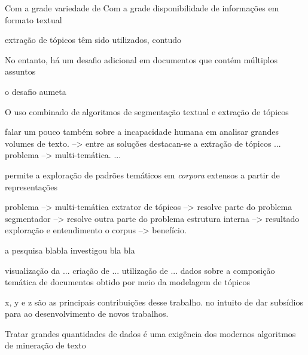 Com a grade variedade de 
Com a grade disponibilidade de informações em formato textual 



extração de tópicos têm sido utilizados, contudo 

No entanto, há um desafio adicional em documentos que contém múltiplos assuntos

o desafio aumeta


O uso combinado de algoritmos de segmentação textual e extração de tópicos



falar um pouco também sobre a incapacidade humana em analisar grandes volumes de texto. 
--> entre as soluções destacan-se a extração de tópicos ...
problema --> multi-temática.
...




permite a exploração de padrões temáticos em \textit{corpora} extensos a partir de representações 



problema --> multi-temática
extrator de tópicos --> resolve parte do problema
segmentador --> resolve outra parte do problema
estrutura interna --> resultado
exploração e entendimento o corpus --> benefício.



a pesquisa blabla investigou bla bla


visualização da ...
criação de ... 
utilização de ...
dados sobre a composição temática de documentos obtido por meio da modelagem de tópicos


x, y e z são as principais contribuições desse trabalho. no intuito de dar subsídios para ao desenvolvimento de novos trabalhos.


Tratar grandes quantidades de dados é uma exigência dos modernos algoritmos de mineração
de texto
















